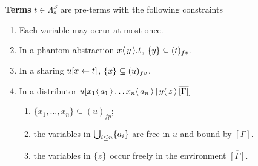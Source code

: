 \documentclass[runningheads]{llncs}
\let\vec\relax
\newcommand\defn{\textbf}
\newcommand{\FALC}{\Lambda^{S}_{a}}
\newcommand{\fv}[1]{(#1)_{fv}}
\newcommand{\fp}[1]{(#1)_{fp}}
\newcommand{\fc}[1]{(#1)_{fc}}
\newcommand{\set}[1]{ \{ #1 \} }
\newcommand{\fake}[3]{#1 \langle \, #2 \, \rangle . #3}
\newcommand{\share}[3]{#1 [#2 \leftarrow #3]}
\newcommand{\dist}[5]{#1 [ #2 \, \vert \, \fakedist{#4}{#5} \, #3 ]}
\newcommand{\fakedist}[2]{#1 \langle \, #2 \, \rangle}
\begin{document}
\begin{definition}
\label{def:falcterms}
\defn{Terms} $t \in \FALC$ are pre-terms with the following constraints
\begin{enumerate}
	\item  Each variable may occur at most once.
	\item In a phantom-abstraction $\fake x{\vec y}t$, $\{\vec y\}\subseteq\fv t$.
	\item In a sharing $\share{u}{\vec x}{t}$, $\set{\vec x} \subseteq \fv{u}$.
	\item  In a distributor $\dist{u}{\fakedist{x_1}{\vec a_1} \dots \fakedist{x_n}{\vec a_n}}{\overline{[\Gamma]}}{y}{\vec z}$  
	\begin{enumerate}
		\item $\set{x_1,\dots,x_n}\subseteq \fp u$;
		\item the variables in $\bigcup_{i\leq n}\{\vec a_i\}$ are free in $u$ and bound by $\overline{[\Gamma]}$.
		\item the variables in $\set{\vec z}$ occur freely in the environment $\overline{[\Gamma]}$.
	\end{enumerate}
\end{enumerate}

\end{definition}
\end{document}
